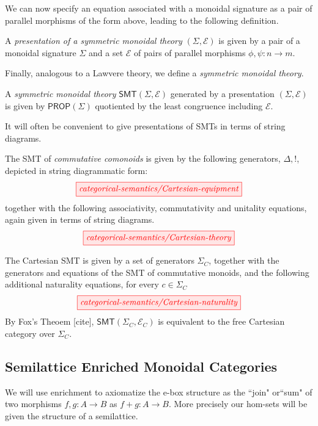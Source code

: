 We can now specify an equation associated with a monoidal signature as a pair of parallel morphisms of the form above, leading to the following definition.
\begin{definition}
A \textit{presentation of a symmetric monoidal theory} $(\Sigma, \mathcal{E})$ is given by a pair of a monoidal signature $\Sigma$ and a set $\mathcal{E}$ of pairs of parallel morphisms $\phi,\psi: n \to m$. 
\end{definition}
Finally, analogous to a Lawvere theory, we define a \textit{symmetric monoidal theory}. 
\begin{definition}
A \textit{symmetric monoidal theory} $\textsf{SMT}(\Sigma,\mathcal{E})$ generated by a presentation $(\Sigma, \mathcal{E})$ is given by $\textsf{PROP}(\Sigma)$ quotiented by the least congruence including $\mathcal{E}$.
\end{definition}

It will often be convenient to give presentations of SMTs in terms of string diagrams.
\begin{example}
The SMT of \textit{commutative comonoids} is given by the following generators, ${\Delta, !}$, depicted in string diagrammatic form:
\[
    \tikzfig{categorical-semantics/Cartesian-equipment}
\]
together with the following associativity, commutativity and unitality equations, again given in terms of string diagrams. 
\[
    \tikzfig{categorical-semantics/Cartesian-theory}
\]
\end{example}

\begin{example}
The Cartesian SMT is given by a set of generators $\Sigma_C$, together with the generators and equations of the SMT of commutative monoids, and the following additional naturality equations, for every $c \in \Sigma_C$
\[
    \tikzfig{categorical-semantics/Cartesian-naturality}
\]
By Fox's Theoem [cite],  $\textsf{SMT}(\Sigma_C, \mathcal{E}_C)$ is equivalent to the free Cartesian category over $\Sigma_C$. 
\end{example}

\subsection{Semilattice Enriched Monoidal Categories}

We will use enrichment to axiomatize the e-box structure as the ``join" or``sum" of two morphisms $f,g: A \to B$ as $f + g: A \to B$.  More precisely our hom-sets will be given the structure of a semilattice.  

